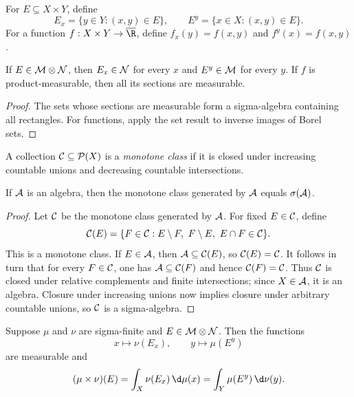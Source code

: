 \begin{de}[Sections]
For $E\subseteq X\times Y$, define
\[
E_x=\{y\in Y:(x,y)\in E\},
\qquad
E^y=\{x\in X:(x,y)\in E\}.
\]
For a function $f:X\times Y\to\olR$, define $f_x(y)=f(x,y)$ and $f^y(x)=f(x,y)$.
\end{de}

\begin{prop}
If $E\in\mathcal{M}\otimes\mathcal{N}$, then $E_x\in\mathcal{N}$ for every $x$ and $E^y\in\mathcal{M}$ for every $y$. If $f$ is product-measurable, then all its sections are measurable.
\end{prop}

\begin{proof}
The sets whose sections are measurable form a sigma-algebra containing all rectangles. For functions, apply the set result to inverse images of Borel sets.
\end{proof}

\begin{de}
A collection $\mathcal{C}\subseteq\mathcal{P}(X)$ is a \emph{monotone class} if it is closed under increasing countable unions and decreasing countable intersections.
\end{de}

\begin{thm}
If $\mathcal{A}$ is an algebra, then the monotone class generated by $\mathcal{A}$ equals $\sigma(\mathcal{A})$.
\end{thm}

\begin{proof}
Let $\mathcal{C}$ be the monotone class generated by $\mathcal{A}$. For fixed $E\in\mathcal{C}$, define
\[
\cC(E)=\{F\in\cC:E\setminus F,\ F\setminus E,\ E\cap F\in\cC\}.
\]
This is a monotone class. If $E\in\mathcal{A}$, then $\mathcal{A}\subseteq\mathcal{C}(E)$, so $\mathcal{C}(E)=\mathcal{C}$. It follows in turn that for every $F\in\mathcal{C}$, one has $\mathcal{A}\subseteq\mathcal{C}(F)$ and hence $\mathcal{C}(F)=\mathcal{C}$. Thus $\mathcal{C}$ is closed under relative complements and finite intersections; since $X\in\mathcal{A}$, it is an algebra. Closure under increasing unions now implies closure under arbitrary countable unions, so $\mathcal{C}$ is a sigma-algebra.
\end{proof}

\begin{thm}
Suppose $\mu$ and $\nu$ are sigma-finite and $E\in\mathcal{M}\otimes\mathcal{N}$. Then the functions
\[
x\longmapsto\nu(E_x),
\qquad
y\longmapsto\mu(E^y)
\]
are measurable and
\[
(\mu\times\nu)(E)
 =\int_X\nu(E_x)\,\d\mu(x)
 =\int_Y\mu(E^y)\,\d\nu(y).
\]
\end{thm}

